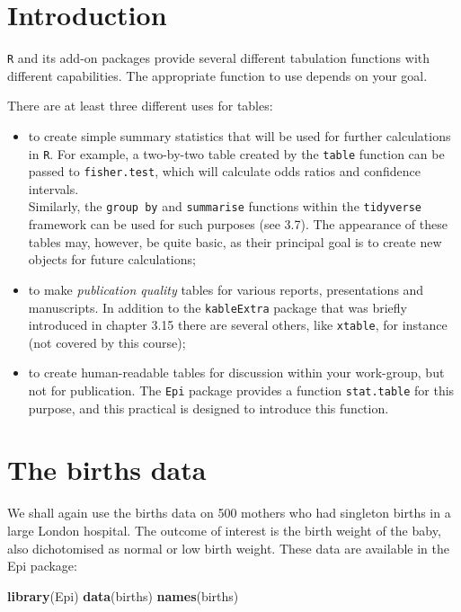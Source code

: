 \documentclass[
]{book}
\newenvironment{Shaded}{\begin{snugshade}}{\end{snugshade}}
\newcommand{\FunctionTok}[1]{\textcolor[rgb]{0.13,0.29,0.53}{\textbf{#1}}}
\newcommand{\NormalTok}[1]{#1}
\theoremstyle{definition}
\theoremstyle{definition}
\theoremstyle{definition}
\theoremstyle{definition}
\theoremstyle{remark}
\begin{document}
\section{Introduction}\label{introduction-2}

\texttt{R} and its add-on packages provide several different
tabulation functions with different capabilities. The appropriate function
to use depends on your goal.

There are at least three different uses for tables:

\begin{itemize}
\item
  to create simple summary statistics that will be used for further calculations in \texttt{R}. For example, a two-by-two table created by the \texttt{table} function can be passed to \texttt{fisher.test}, which will calculate odds ratios and confidence intervals.\\
  Similarly, the \texttt{group\ by} and \texttt{summarise} functions within the \texttt{tidyverse} framework can be used for such purposes (see 3.7).
  The appearance of these tables may, however, be quite basic,
  as their principal goal is to create new objects for future calculations;
\item
  to make \emph{publication quality} tables for various reports, presentations and manuscripts. In addition to the \texttt{kableExtra}
  package that was briefly introduced in chapter 3.15 there are several others, like \texttt{xtable}, for instance (not covered by this course);
\item
  to create human-readable tables for discussion within your work-group, but not for publication. The
  \texttt{Epi} package provides a function \texttt{stat.table} for this purpose,
  and this practical is designed to introduce this function.
\end{itemize}

\section{The births data}\label{the-births-data-1}

We shall again use the births data on 500 mothers who had
singleton births in a large London hospital. The outcome of interest
is the birth weight of the baby, also dichotomised as normal or low
birth weight. These data are available in the Epi package:

\begin{Shaded}
\begin{Highlighting}[]
\FunctionTok{library}\NormalTok{(Epi)}
\FunctionTok{data}\NormalTok{(births)}
\FunctionTok{names}\NormalTok{(births)}
\end{Highlighting}
\end{Shaded}
\end{document}
